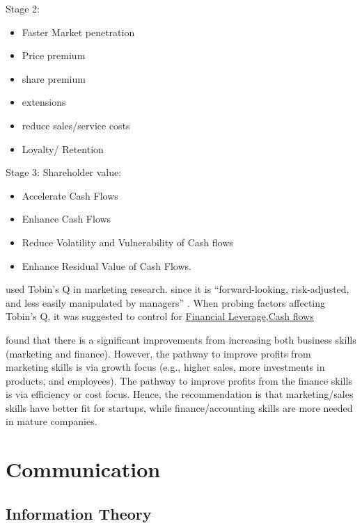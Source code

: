 \documentclass[
]{book}
\providecommand{\tightlist}{%
  \setlength{\itemsep}{0pt}\setlength{\parskip}{0pt}}
\begin{document}
Stage 2:

\begin{itemize}
\tightlist
\item
  Faster Market penetration
\item
  Price premium
\item
  share premium
\item
  extensions
\item
  reduce sales/service costs
\item
  Loyalty/ Retention
\end{itemize}

Stage 3: Shareholder value:

\begin{itemize}
\tightlist
\item
  Accelerate Cash Flows
\item
  Enhance Cash Flows
\item
  Reduce Volatility and Vulnerability of Cash flows
\item
  Enhance Residual Value of Cash Flows.
\end{itemize}

\citep{Grewal_2010, McAlister_2016, Morgan_2009} used Tobin's Q in
marketing research. since it is ``forward-looking, risk-adjusted, and
less easily manipulated by managers'' \citep{Wies_2019}. When probing factors
affecting Tobin's Q, it was suggested to control for \protect\hyperlink{financial-leverage}{Financial
Leverage},\protect\hyperlink{cash-flows}{Cash flows}

\citep{anderson2018} found that there is a significant improvements from
increasing both business skills (marketing and finance). However, the
pathway to improve profits from marketing skills is via growth focus
(e.g., higher sales, more investments in products, and employees). The
pathway to improve profits from the finance skills is via efficiency or
cost focus. Hence, the recommendation is that marketing/sales skills
have better fit for startups, while finance/accounting skills are more
needed in mature companies.

\hypertarget{communication}{%
\chapter{Communication}\label{communication}}

\hypertarget{information-theory}{%
\section{Information Theory}\label{information-theory}}
\end{document}
